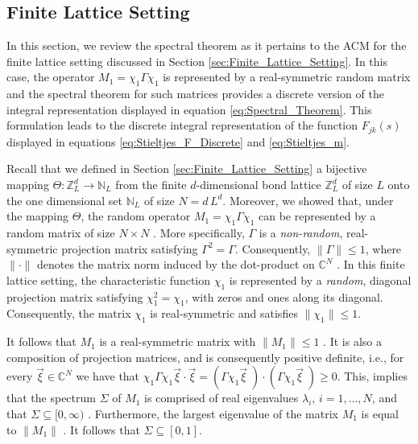 \documentclass{cmslatex}
\begin{document}
\subsection{Finite Lattice Setting}
\label{sec:The_Spectral_Theorem_Finite_Lattice}
%
In this section, we review the spectral theorem as it pertains to the
ACM for the finite lattice setting discussed in Section
\ref{sec:Finite_Lattice_Setting}. In this case, the operator
$M_1=\chi_1\Gamma\chi_1$ is represented by a real-symmetric random matrix and the
spectral theorem for such matrices provides a discrete version of the
integral representation displayed in equation
\eqref{eq:Spectral_Theorem}. This formulation leads to the discrete
integral representation of the function $F_{jk}(s)$ displayed in
equations \eqref{eq:Stieltjes_F_Discrete} and \eqref{eq:Stieltjes_m}.   



Recall that we defined in Section \ref{sec:Finite_Lattice_Setting} a
bijective mapping $\Theta:\mathbb{Z}_L^d\to\mathbb{N}_L$ from the finite
$d$-dimensional bond lattice $\mathbb{Z}_L^d$ of size $L$ onto the
one dimensional set $\mathbb{N}_L$ of size $N=d\,L^d$. Moreover, we showed that, under the
mapping $\Theta$, the random operator $M_1=\chi_1\Gamma\chi_1$ can be represented by a
random matrix of size $N\times N$
\cite{Golden:JBM:337,Murphy:JMP:063506}. More specifically, $\Gamma$ 
is a \emph{non-random}, real-symmetric projection matrix  satisfying
$\Gamma^2=\Gamma$. Consequently, $\|\Gamma\|\leq1$, where $\|\cdot\|$ denotes the matrix norm
induced by the dot-product on $\mathbb{C}^N$
\cite{Demmel:1997}. In this finite lattice setting, the characteristic
function $\chi_1$ is represented by a \emph{random}, diagonal projection
matrix satisfying $\chi_1^2=\chi_1$, with zeros and ones along its
diagonal. Consequently, the matrix $\chi_1$ is real-symmetric and satisfies
$\|\chi_1\|\leq1$. 



It follows that $M_1$ is a real-symmetric matrix with $\|M_1\|\leq1$
\cite{Demmel:1997}. It is also a composition of projection matrices,
and is consequently positive definite, i.e., for every
$\vec{\xi}\in\mathbb{C}^N$ we have that
$\chi_1\Gamma\chi_1\vec{\xi}\cdot\vec{\xi}=(\Gamma\chi_1\vec{\xi}\;)\cdot(\Gamma\chi_1\vec{\xi}\;)\geq0$. This,
implies that the spectrum $\Sigma$ of $M_1$ is comprised of real
eigenvalues $\lambda_i$, $i=1,\ldots,N$, and that $\Sigma\subseteq[0,\infty)$
\cite{Horn_Johnson-1990}. Furthermore, the largest eigenvalue of the
matrix $M_1$ is equal to $\|M_1\|$ \cite{Demmel:1997}. It follows that $\Sigma\subseteq[0,1]$.   
\end{document}
